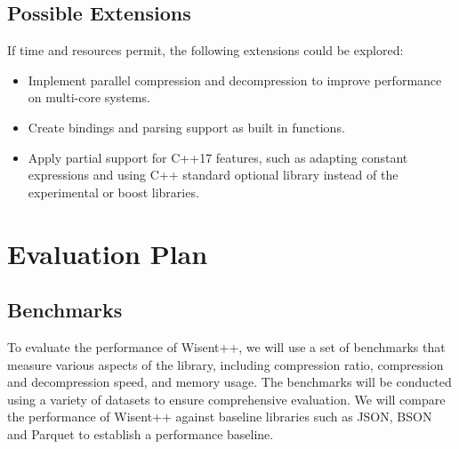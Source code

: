 \section{Possible Extensions}

If time and resources permit, the following extensions could be explored:

\begin{itemize}
   \item Implement parallel compression and decompression to improve performance on multi-core systems.
   
   \item Create bindings and parsing support as built in functions. 

   \item Apply partial support for C++17 features, such as adapting constant expressions and using C++ standard optional library instead of the experimental or boost libraries\cite{cppreference_optional}. 

\end{itemize}



\newpage








\chapter{Evaluation Plan}
\thispagestyle{chapterstyle}

\section{Benchmarks}

To evaluate the performance of Wisent++, we will use a set of benchmarks that measure various aspects of the library, including compression ratio, compression and decompression speed, and memory usage. The benchmarks will be conducted using a variety of datasets to ensure comprehensive evaluation. We will compare the performance of Wisent++ against baseline libraries such as JSON, BSON and Parquet to establish a performance baseline.

